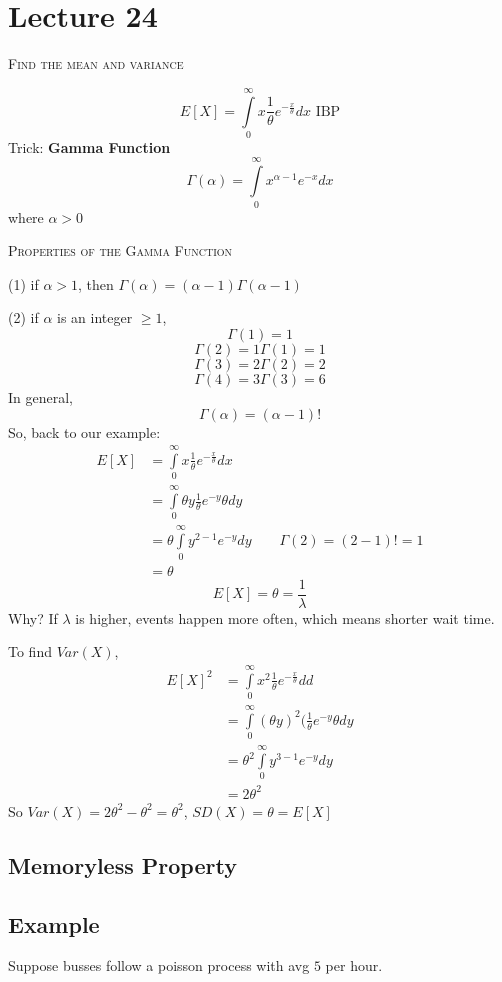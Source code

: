 \section{Lecture 24}
\textsc{Find the mean and variance}

\[ E[X]=\int\limits_{0}^{\infty} x \frac{1}{\theta}e^{-\frac{x}{\theta}} d{x}  \text{ IBP} \]
Trick: \textbf{Gamma Function}
\[ \Gamma(\alpha)=\int\limits_{0}^{\infty} x^{\alpha -1}e^{-x} d{x}  \]
where $ \alpha>0 $

\textsc{Properties of the Gamma Function}

(1) if $ \alpha>1 $, then $ \Gamma(\alpha)=(\alpha-1)\Gamma(\alpha-1) $

(2) if $ \alpha $ is an integer $ \ge 1 $,
\[ \Gamma(1)=1 \]
\[ \Gamma(2)=1\Gamma(1)=1 \]
\[ \Gamma(3)=2\Gamma(2)=2 \]
\[ \Gamma(4)=3\Gamma(3)=6 \]
In general,
\[ \Gamma(\alpha)=(\alpha-1)! \]
So, back to our example:
\begin{align*}
    E[X]&=\int\limits_{0}^{\infty} x \frac{1}{\theta}e^{-\frac{x}{\theta}} d{x}\\
    &=\int\limits_{0}^{\infty} \theta y \frac{1}{\theta} e^{-y}\theta d{y}\\
    &=\theta \int\limits_{0}^{\infty} y^{2-1}e^{-y} d{y}\qquad \Gamma(2)=(2-1)!=1\\
    &=\theta
\end{align*}
\[ E[X]=\theta=\frac{1}{\lambda} \]
Why?
If $ \lambda $ is higher, events happen more often, which means shorter wait time.

To find $ Var(X) $,
\begin{align*}
    E[X]^2&=\int\limits_{0}^{\infty} x^2 \frac{1}{\theta}e^{-\frac{x}{\theta}}  d{d}\\
    &=\int\limits_{0}^{\infty} (\theta y)^2(\frac{1}{\theta}e^{-y}\theta d{y}\\
    &=\theta^2 \int\limits_{0}^{\infty} y^{3-1}e^{-y} d{y}\\
    &=2\theta^2
\end{align*}
So $ Var(X)=2\theta^2-\theta^2=\theta^2 $, $ SD(X)=\theta=E[X] $

\subsection{Memoryless Property}
\subsection{Example}
Suppose busses follow a poisson process with avg $ 5 $ per hour.

